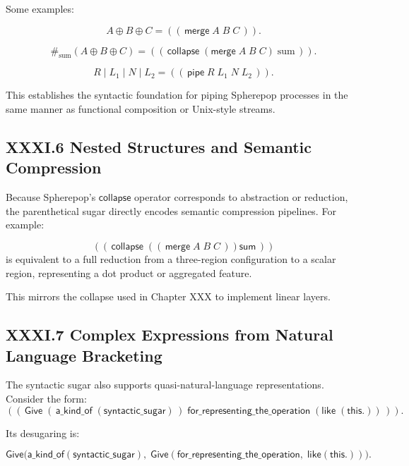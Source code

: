 \documentclass[12pt,letterpaper]{article}
\begin{document}
Some examples:

\[
A \oplus B \oplus C
=
((\,\mathsf{merge}\; A\; B\; C\,)).
\]

\[
\#_{\text{sum}}(A \oplus B \oplus C)
=
((\,\mathsf{collapse}\; (\mathsf{merge}\; A\; B\; C)\; \text{sum}\,)).
\]

\[
R \mid L_1 \mid N \mid L_2
=
((\,\mathsf{pipe}\; R\; L_1\; N\; L_2\,)).
\]

This establishes the syntactic foundation for piping Spherepop processes in the same manner as functional composition or Unix-style streams.

\subsection{XXXI.6 Nested Structures and Semantic Compression}

Because Spherepop's $\mathsf{collapse}$ operator corresponds to abstraction or reduction, the parenthetical sugar directly encodes semantic compression pipelines. For example:

\[
((\,\mathsf{collapse}\;
     ((\,\mathsf{merge}\; A\; B\; C\,))
     \mathsf{sum}\,))
\]
is equivalent to a full reduction from a three-region configuration to a scalar region, representing a dot product or aggregated feature.

This mirrors the collapse used in Chapter XXX to implement linear layers.

\subsection{XXXI.7 Complex Expressions from Natural Language Bracketing}

The syntactic sugar also supports quasi-natural-language representations. Consider the form:
\[
((\,\mathsf{Give}\;
       (\,\mathsf{a\_kind\_of}\;(\mathsf{syntactic\_sugar})\,)\;
       \mathsf{for\_representing\_the\_operation}\;
       (\mathsf{like}\;(\mathsf{this.}))\,)).
\]

Its desugaring is:

\[
\mathsf{Give}\Big(
     \mathsf{a\_kind\_of}(\mathsf{syntactic\_sugar}),\;
     \mathsf{Give}(
         \mathsf{for\_representing\_the\_operation},\;
         \mathsf{like}(\mathsf{this.})
     )
\Big).
\]
\end{document}
